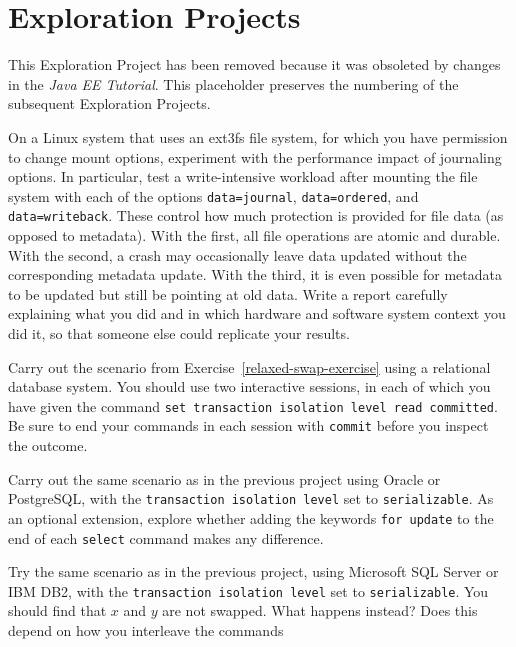 \section*{Exploration Projects}
\begin{chapterEnumerate}
\item
\iffalse
Work through the examples in the ``Transactions'' Chapter of the
\textit{Java EE Tutorial}. This is Chapter 51 as of \textit{Java EE 7 Tutorial}.
\else
This Exploration Project has been removed because it was obsoleted by changes in the \textit{Java EE Tutorial}. This placeholder preserves the numbering of the subsequent Exploration Projects.
\fi
\item
On a Linux system that uses an ext3fs file system, for which you have
permission to change mount options, experiment with the performance
impact of journaling options.  In particular, test a write-intensive
workload after mounting the file system with each of the options
\verb|data=journal|, \verb|data=ordered|, and
\verb|data=writeback|.  These control how much protection is
provided for file data (as opposed to metadata).  With the first, all
file operations are atomic and durable.  With the second, a crash may
occasionally leave data updated without the corresponding metadata
update.  With the third, it is even possible for metadata to be
updated but still be pointing at old data.  
Write a report 
carefully explaining what you did and in which hardware and software
system context you did it, so that someone else could replicate
your results.
\item
Carry out the scenario from Exercise~\ref{relaxed-swap-exercise} using a relational
database system.  You should use two interactive sessions, in each of
which you have given the command {\tt set transaction isolation level
read committed}.  Be sure to end your commands in each session with
{\tt commit} before  you inspect the outcome.
\item
Carry out the same scenario as in the previous project using Oracle
or PostgreSQL, with the {\tt transaction isolation level} set to
{\tt serializable}. As an optional extension, explore whether adding the keywords \texttt{for update} to the end of each \texttt{select} command makes any difference.
\item
Try the same scenario as in the previous project, using Microsoft SQL
Server or IBM DB2, with the {\tt transaction isolation level} set to
{\tt serializable}.  You should find that $x$ and $y$ are not swapped.  What
happens instead?  Does this depend on how you interleave the commands

\end{chapterEnumerate}
